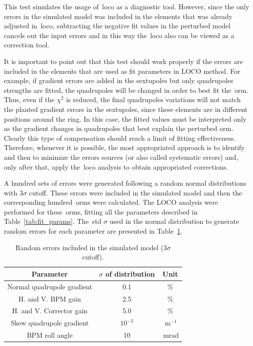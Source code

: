 This test simulates the usage of~\gls{loco} as a diagnostic tool. However, since the only errors in the simulated model was included in the elements that was already adjusted in~\gls{loco}, subtracting the negative fit values in the perturbed model cancels out the input errors and in this way the~\gls{loco} also can be viewed as a correction tool.

It is important to point out that this test should work properly if the errors are included in the elements that are used as fit parameters in LOCO method. For example, if gradient errors are added in the sextupoles but only quadrupoles strengths are fitted, the quadrupoles will be changed in order to best fit the~\gls{orm}. Thus, even if the $\chi^2$ is reduced, the final quadrupoles variations will not match the planted gradient errors in the sextupoles, since these elements are in different positions around the ring. In this case, the fitted values must be interpreted only as the gradient changes in quadrupoles that best explain the perturbed \gls{orm}. Clearly this type of compensation should reach a limit of fitting effectiveness. Therefore, whenever it is possible, the most appropriated approach is to identify and then to minimize the errors sources (or also called systematic errors) and, only after that, apply the~\gls{loco} analysis to obtain appropriated corrections.

A hundred sets of errors were generated following a random normal distributions with $3\sigma$ cutoff. These errors were included in the simulated model and then the corresponding hundred~\gls{orm}s were calculated. The LOCO analysis were performed for these~\gls{orm}s, fitting all the parameters described in Table~\ref{tab:fit_params}. The~\gls{std} $\sigma$ used in the normal distribution to generate random errors for each parameter are presented in Table~\ref{tab:errors}.
\begin{table}[h!]
    \centering
    \caption{Random errors included in the simulated model ($3\sigma$ cutoff).}
    \label{tab:errors}
    \begin{tabular}{ccc}
        \toprule\toprule
        Parameter & $\sigma$ of distribution & Unit\\ 
        \hline
        Normal quadrupole gradient & 0.1 &\% \\
        H. and V. BPM gain &  2.5 & \% \\
        H. and V. Corrector gain & 5.0 &\% \\
        Skew quadrupole gradient & $10^{-3}$ &$\SI{}{\meter^{-1}}$ \\
        BPM roll angle & 10 & $\SI{}{\milli\radian}$ \\ 
        \bottomrule\bottomrule
    \end{tabular}
\end{table}

